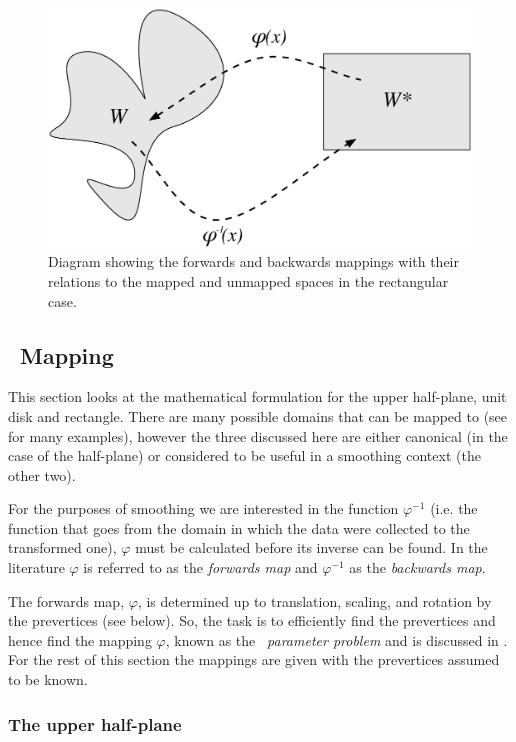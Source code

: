 \begin{figure} [t]
\centering
\includegraphics[scale=0.5]{sc/figs/mappingdia.pdf}
\caption{Diagram showing the forwards and backwards mappings with their relations to the mapped and unmapped spaces in the rectangular case.}
\label{mappingdia}
\end{figure}

\subsection{\sch\ Mapping}
\label{schparprob}
This section looks at the mathematical formulation for the upper half-plane, unit disk and rectangle. There are many possible domains that can be mapped to (see \cite[section 4]{driscoll} for many examples), however the three discussed here are either canonical (in the case of the half-plane) or considered to be useful in a smoothing context (the other two).

For the purposes of smoothing we are interested in the function $\varphi^{-1}$ (i.e. the function that goes from the domain in which the data were collected to the transformed one), $\varphi$ must be calculated before its inverse can be found. In the literature $\varphi$ is referred to as the \emph{forwards map} and $\varphi^{-1}$ as the \emph{backwards map}.

The forwards map, $\varphi$, is determined up to translation, scaling, and rotation by the prevertices (see below). So, the task is to efficiently find the prevertices and hence find the mapping $\varphi$, known as the \emph{\sch\ parameter problem} and is discussed in . For the rest of this section the mappings are given with the prevertices assumed to be known.

\subsubsection{The upper half-plane}
\label{sc-parprob}


